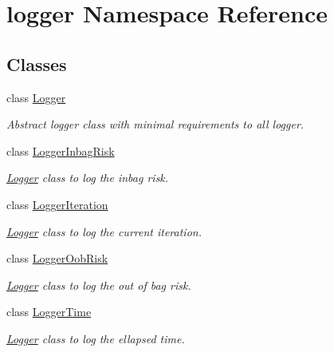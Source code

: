 \hypertarget{namespacelogger}{}\section{logger Namespace Reference}
\label{namespacelogger}
\subsection*{Classes}
\begin{DoxyCompactItemize}
\item 
class \mbox{\hyperlink{classlogger_1_1_logger}{Logger}}
\begin{DoxyCompactList}\small\item\em Abstract logger class with minimal requirements to all logger. \end{DoxyCompactList}\item 
class \mbox{\hyperlink{classlogger_1_1_logger_inbag_risk}{Logger\+Inbag\+Risk}}
\begin{DoxyCompactList}\small\item\em \mbox{\hyperlink{classlogger_1_1_logger}{Logger}} class to log the inbag risk. \end{DoxyCompactList}\item 
class \mbox{\hyperlink{classlogger_1_1_logger_iteration}{Logger\+Iteration}}
\begin{DoxyCompactList}\small\item\em \mbox{\hyperlink{classlogger_1_1_logger}{Logger}} class to log the current iteration. \end{DoxyCompactList}\item 
class \mbox{\hyperlink{classlogger_1_1_logger_oob_risk}{Logger\+Oob\+Risk}}
\begin{DoxyCompactList}\small\item\em \mbox{\hyperlink{classlogger_1_1_logger}{Logger}} class to log the out of bag risk. \end{DoxyCompactList}\item 
class \mbox{\hyperlink{classlogger_1_1_logger_time}{Logger\+Time}}
\begin{DoxyCompactList}\small\item\em \mbox{\hyperlink{classlogger_1_1_logger}{Logger}} class to log the ellapsed time. \end{DoxyCompactList}\end{DoxyCompactItemize}
